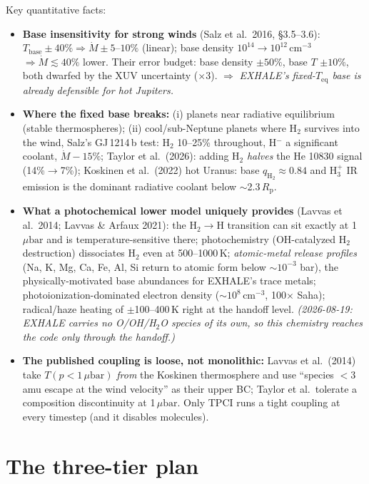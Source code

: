 \documentclass[english,a4paper]{my_memo}
\newcommand{\Rp}{R_{\mathrm{p}}}
\newcommand{\Mdot}{\dot{M}}
\newcommand{\ubar}{\mu\mathrm{bar}}
\newcommand{\qHH}{q_{\mathrm{H_2}}}
\begin{document}
\noindent Key quantitative facts:
\begin{itemize}
\item \textbf{Base insensitivity for strong winds} (Salz et al.\ 2016, \S3.5--3.6):
  $T_\mathrm{base}\pm40\% \Rightarrow \Mdot\pm5$--$10\%$ (linear); base density
  $10^{14}\to10^{12}$\,cm$^{-3}$ $\Rightarrow \Mdot\lesssim40\%$ lower. Their error budget:
  base density $\pm50\%$, base $T$ $\pm10\%$, both dwarfed by the XUV uncertainty
  ($\times3$). $\Rightarrow$ \emph{EXHALE's fixed-$T_\mathrm{eq}$ base is already
  defensible for hot Jupiters.}
\item \textbf{Where the fixed base breaks:} (i) planets near radiative equilibrium
  (stable thermospheres); (ii) cool/sub-Neptune planets where H$_2$ survives into the
  wind, Salz's GJ\,1214\,b test: H$_2$ 10--25\% throughout, H$^-$ a significant coolant,
  $\Mdot-15\%$; Taylor et al.\ (2026): adding H$_2$ \emph{halves} the He 10830 signal
  (14\%$\to$7\%); Koskinen et al.\ (2022) hot Uranus: base $\qHH\approx0.84$ and H$_3^+$ IR
  emission is the dominant radiative coolant below $\sim$2.3\,$\Rp$.
\item \textbf{What a photochemical lower model uniquely provides} (Lavvas et al.\ 2014;
  Lavvas \& Arfaux 2021): the H$_2\to$H transition can sit exactly at 1\,$\ubar$ and is
  temperature-sensitive there; photochemistry (OH-catalyzed H$_2$ destruction) dissociates
  H$_2$ even at 500--1000\,K; \emph{atomic-metal release profiles} (Na, K, Mg, Ca, Fe, Al,
  Si return to atomic form below $\sim$$10^{-3}$ bar), the physically-motivated base
  abundances for EXHALE's trace metals; photoionization-dominated electron density
  ($\sim$$10^{8}$\,cm$^{-3}$, 100$\times$ Saha); radical/haze heating of $\pm$100--400\,K
  right at the handoff level. \emph{(2026-08-19: EXHALE carries no O/OH/H$_2$O
  species of its own, so this chemistry reaches the code only through the
  handoff.)}
\item \textbf{The published coupling is loose, not monolithic:} Lavvas et al.\ (2014) take
  $T(p<1\,\ubar)$ \emph{from} the Koskinen thermosphere and use ``species $<3$ amu escape
  at the wind velocity'' as their upper BC; Taylor et al.\ tolerate a composition
  discontinuity at 1\,$\ubar$. Only TPCI runs a tight coupling at every timestep (and it
  disables molecules).
\end{itemize}

\section{The three-tier plan}
\end{document}
